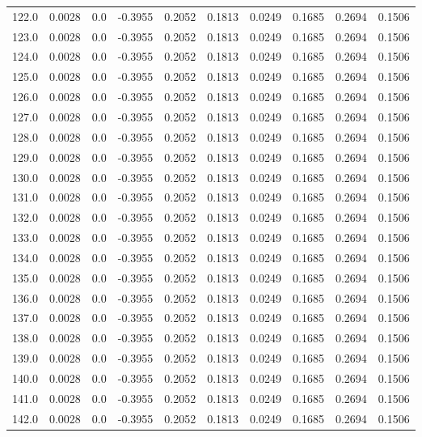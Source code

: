 \begin{longtable}{lrrrrrrrrr}
122.0 & 0.0028 & 0.0 & -0.3955 & 0.2052 & 0.1813 & 0.0249 & 0.1685 & 0.2694 & 0.1506 \\
123.0 & 0.0028 & 0.0 & -0.3955 & 0.2052 & 0.1813 & 0.0249 & 0.1685 & 0.2694 & 0.1506 \\
124.0 & 0.0028 & 0.0 & -0.3955 & 0.2052 & 0.1813 & 0.0249 & 0.1685 & 0.2694 & 0.1506 \\
125.0 & 0.0028 & 0.0 & -0.3955 & 0.2052 & 0.1813 & 0.0249 & 0.1685 & 0.2694 & 0.1506 \\
126.0 & 0.0028 & 0.0 & -0.3955 & 0.2052 & 0.1813 & 0.0249 & 0.1685 & 0.2694 & 0.1506 \\
127.0 & 0.0028 & 0.0 & -0.3955 & 0.2052 & 0.1813 & 0.0249 & 0.1685 & 0.2694 & 0.1506 \\
128.0 & 0.0028 & 0.0 & -0.3955 & 0.2052 & 0.1813 & 0.0249 & 0.1685 & 0.2694 & 0.1506 \\
129.0 & 0.0028 & 0.0 & -0.3955 & 0.2052 & 0.1813 & 0.0249 & 0.1685 & 0.2694 & 0.1506 \\
130.0 & 0.0028 & 0.0 & -0.3955 & 0.2052 & 0.1813 & 0.0249 & 0.1685 & 0.2694 & 0.1506 \\
131.0 & 0.0028 & 0.0 & -0.3955 & 0.2052 & 0.1813 & 0.0249 & 0.1685 & 0.2694 & 0.1506 \\
132.0 & 0.0028 & 0.0 & -0.3955 & 0.2052 & 0.1813 & 0.0249 & 0.1685 & 0.2694 & 0.1506 \\
133.0 & 0.0028 & 0.0 & -0.3955 & 0.2052 & 0.1813 & 0.0249 & 0.1685 & 0.2694 & 0.1506 \\
134.0 & 0.0028 & 0.0 & -0.3955 & 0.2052 & 0.1813 & 0.0249 & 0.1685 & 0.2694 & 0.1506 \\
135.0 & 0.0028 & 0.0 & -0.3955 & 0.2052 & 0.1813 & 0.0249 & 0.1685 & 0.2694 & 0.1506 \\
136.0 & 0.0028 & 0.0 & -0.3955 & 0.2052 & 0.1813 & 0.0249 & 0.1685 & 0.2694 & 0.1506 \\
137.0 & 0.0028 & 0.0 & -0.3955 & 0.2052 & 0.1813 & 0.0249 & 0.1685 & 0.2694 & 0.1506 \\
138.0 & 0.0028 & 0.0 & -0.3955 & 0.2052 & 0.1813 & 0.0249 & 0.1685 & 0.2694 & 0.1506 \\
139.0 & 0.0028 & 0.0 & -0.3955 & 0.2052 & 0.1813 & 0.0249 & 0.1685 & 0.2694 & 0.1506 \\
140.0 & 0.0028 & 0.0 & -0.3955 & 0.2052 & 0.1813 & 0.0249 & 0.1685 & 0.2694 & 0.1506 \\
141.0 & 0.0028 & 0.0 & -0.3955 & 0.2052 & 0.1813 & 0.0249 & 0.1685 & 0.2694 & 0.1506 \\
142.0 & 0.0028 & 0.0 & -0.3955 & 0.2052 & 0.1813 & 0.0249 & 0.1685 & 0.2694 & 0.1506 \\

\end{longtable}

